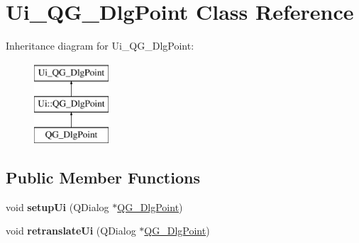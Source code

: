 \hypertarget{classUi__QG__DlgPoint}{\section{Ui\-\_\-\-Q\-G\-\_\-\-Dlg\-Point Class Reference}
\label{classUi__QG__DlgPoint}
}
Inheritance diagram for Ui\-\_\-\-Q\-G\-\_\-\-Dlg\-Point\-:\begin{figure}[H]
\begin{center}
\leavevmode
\includegraphics[height=3.000000cm]{classUi__QG__DlgPoint}
\end{center}
\end{figure}
\subsection*{Public Member Functions}
\begin{DoxyCompactItemize}
\item 
\hypertarget{classUi__QG__DlgPoint_a3d51c008de424d4e31641954493e1c1a}{void {\bfseries setup\-Ui} (Q\-Dialog $\ast$\hyperlink{classQG__DlgPoint}{Q\-G\-\_\-\-Dlg\-Point})}\label{classUi__QG__DlgPoint_a3d51c008de424d4e31641954493e1c1a}

\item 
\hypertarget{classUi__QG__DlgPoint_afeaaf9d211e252e416ac6809d554f9f3}{void {\bfseries retranslate\-Ui} (Q\-Dialog $\ast$\hyperlink{classQG__DlgPoint}{Q\-G\-\_\-\-Dlg\-Point})}\label{classUi__QG__DlgPoint_afeaaf9d211e252e416ac6809d554f9f3}

\end{DoxyCompactItemize}
